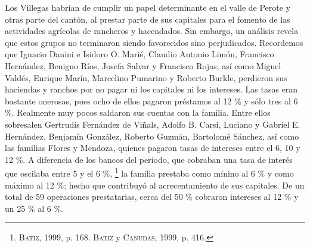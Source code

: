 \documentclass[14pt,twoside,final]{extbook} %
\let\oldfootnote\footnote
\renewcommand\footnote[1]{%
\oldfootnote{\hspace{1mm}#1}}
\begin{document}
Los Villegas habrían de cumplir un papel determinante en el valle de Perote y otras parte del cantón, al prestar parte de sus capitales para el fomento de las actividades agrícolas de rancheros y hacendados. Sin embargo, un análisis revela que estos grupos no terminaron siendo favorecidos sino perjudicados. Recordemos que Ignacio Danini e Isidoro O. Marié, Claudio Antonio Limón, Francisco Hernández, Benigno Ríos, Josefa Salvar y Francisco Rojas; así como Miguel Valdés, Enrique Marín, Marcelino Pumarino y Roberto Burkle, perdieron sus haciendas y ranchos por no pagar ni los capitales ni los intereses. Las tasas eran bastante onerosas, pues ocho de ellos pagaron préstamos al 12 \% y sólo tres al 6 \%. Realmente muy pocos saldaron sus cuentas con la familia. Entre ellos sobresalen Gertrudis Fernández de Viñals, Adolfo B. Carsi, Luciano y Gabriel E. Hernández, Benjamín González, Roberto Guzmán, Bartolomé Sánchez, así como las familias Flores y Mendoza, quienes pagaron tasas de
intereses entre el 6, 10 y 12 \%. A diferencia de los bancos del periodo, que cobraban una tasa de interés que oscilaba entre 5 y el 6 \%,\footnote{\textsc{Batiz}, 1999, p. 168. \textsc{Batiz} y \textsc{Canudas}, 1999, p. 416.} la familia prestaba como mínino al 6 \% y como máximo al 12 \%; hecho que contribuyó al acrecentamiento de sus capitales. De un total de 59 operaciones prestatarias, cerca del 50 \% cobraron intereses al 12 \% y un 25 \% al 6 \%.
\end{document}
